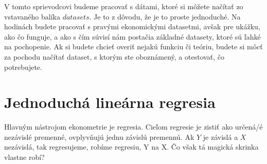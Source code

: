 V tomto sprievodcovi budeme pracovať s dátami, ktoré si môžete načítať
zo vstavaného balíka \(datasets\). Je to z dôvodu, že je to proste
jednoduché. Na hodinách budete pracovať s pravými ekonomickými
datasetmi, avšak pre ukážku, ako čo funguje, a ako s čím súvisí nám
postačia základné datasety, ktoré sú ľahké na pochopenie. Ak si budete
chcieť overiť nejakú funkciu či teóriu, budete si môcť za pochodu
načítať dataset, s ktorým ste oboznámený, a otestovať, čo potrebujete.

\begin{Shaded}
\begin{Highlighting}[]
\StringTok{ }\OperatorTok{::}
\NormalTok{(}\NormalTok{)}
\end{Highlighting}
\end{Shaded}

\newpage

\hypertarget{jednoduchuxe1-lineuxe1rna-regresia}{%
\section{Jednoduchá lineárna
regresia}\label{jednoduchuxe1-lineuxe1rna-regresia}}

Hlavným nástrojom ekonometrie je regresia. Cieľom regresie je zistiť ako
určená/é nezávislé premenné, ovplyvňujú jednu závislú premennú. Ak \(Y\)
je závislá a \(X\) nezávislá, tak regresujeme, robíme regresiu, Y na X.
Čo však tá magická skrinka vlastne robí?

\begin{Shaded}
\begin{Highlighting}[]

\end{Highlighting}
\end{Shaded}

